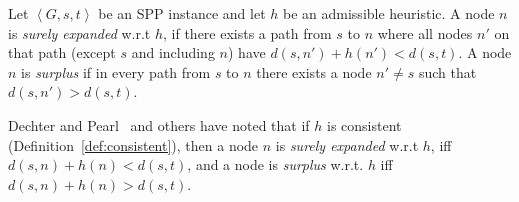 \documentclass[smallextended]{svjour3}       %
\newcommand{\spp}{\ac{SPP}\xspace}
\newcommand{\tuple}[1]{\ensuremath{\left \langle #1 \right \rangle }}
\newcommand{\abda}[1]{\textbf{[AS:#1]}}
\begin{document}


  

\begin{definition}
  \label{def:surplus}
  Let $\tuple{G, s, t}$ be an \spp instance and let $h$ be an admissible heuristic.
  A node $n$ is \emph{surely expanded} w.r.t $h$, if there exists a path from $s$ to $n$ where all nodes $n'$ on that path (except $s$ and including $n$) have $d(s,n')+h(n')<d(s,t)$. 
  A node $n$ is \emph{surplus} if in every path from $s$ to $n$ there exists a node $n'\neq s$ such that $d(s,n')>d(s,t)$. 
\end{definition}
Dechter and Pearl~\cite{dechter1985generalizedBestFirst} and others have noted that if $h$ is consistent (Definition~\ref{def:consistent}), then a node $n$ is \emph{surely expanded} w.r.t $h$, iff $d(s,n)+h(n)<d(s,t)$, and a node is \emph{surplus} w.r.t. $h$ iff $d(s,n)+h(n)>d(s,t)$. 
    
\end{document}
